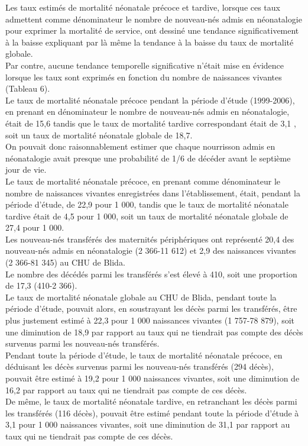 Les taux estimés de mortalité néonatale précoce et tardive,
lorsque ces taux admettent comme dénominateur le nombre
de nouveau-nés admis en néonatalogie pour exprimer la
mortalité de service, ont dessiné une tendance significativement
à la baisse expliquant par là même la tendance à la
baisse du taux de mortalité globale. \\

Par contre, aucune
tendance temporelle significative n’était mise en évidence
lorsque les taux sont exprimés en fonction du nombre de
naissances vivantes (Tableau 6).\\

Le taux de mortalité néonatale précoce pendant la période
d’étude (1999-2006), en prenant en dénominateur le nombre
de nouveau-nés admis en néonatalogie, était de 15,6 %
tandis que le taux de mortalité tardive correspondant était de
3,1 , soit un taux de mortalité néonatale globale de 18,7.\\

On pouvait donc raisonnablement estimer que chaque
nourrisson admis en néonatalogie avait presque une
probabilité de 1/6 de décéder avant le septième jour de vie.\\

Le taux de mortalité néonatale précoce, en prenant comme
dénominateur le nombre de naissances vivantes enregistrées
dans l’établissement, était, pendant la période d’étude, de
22,9 pour 1 000, tandis que le taux de mortalité néonatale
tardive était de 4,5 pour 1 000, soit un taux de mortalité
néonatale globale de 27,4 pour 1 000.\\
Les nouveau-nés transférés des maternités périphériques
ont représenté 20,4  des nouveau-nés admis en néonatalogie
(2 366-11 612) et 2,9 des naissances vivantes
(2 366-81 345) au CHU de Blida.\\

Le nombre des décédés
parmi les transférés s’est élevé à 410, soit une proportion de
17,3 (410-2 366).\\

Le taux de mortalité néonatale globale au CHU de Blida,
pendant toute la période d’étude, pouvait alors, en soustrayant
les décès parmi les transférés, être plus justement estimé à
22,3 pour 1 000 naissances vivantes (1 757-78 879), soit une
diminution de 18,9 par rapport au taux qui ne tiendrait
pas compte des décès survenus parmi les nouveau-nés
transférés.\\

Pendant toute la période d’étude, le taux de mortalité
néonatale précoce, en déduisant les décès survenus parmi les
nouveau-nés transférés (294 décès), pouvait être estimé à
19,2 pour 1 000 naissances vivantes, soit une diminution
de 16,2 par rapport au taux qui ne tiendrait pas compte de
ces décès.\\

De même, le taux de mortalité néonatale tardive, en
retranchant les décès parmi les transférés (116 décès),
pouvait être estimé pendant toute la période d’étude à 3,1
pour 1 000 naissances vivantes, soit une diminution de
31,1 par rapport au taux qui ne tiendrait pas compte de ces
décès.\\
